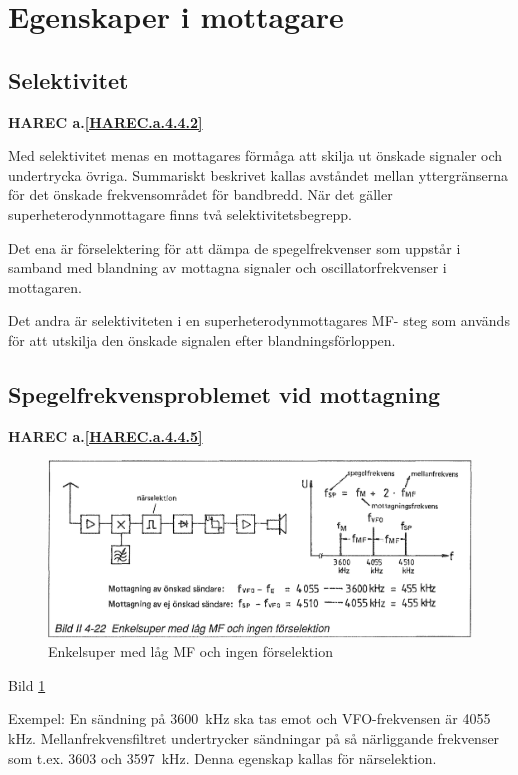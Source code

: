 \section{Egenskaper i mottagare}

\subsection{Selektivitet}
\textbf{HAREC a.\ref{HAREC.a.4.4.2}\label{myHAREC.a.4.4.2}}

Med selektivitet menas en mottagares förmåga att skilja ut önskade
signaler och undertrycka övriga. Summariskt beskrivet kallas avståndet
mellan yttergränserna för det önskade frekvensområdet för
bandbredd. När det gäller superheterodynmottagare finns två
selektivitetsbegrepp.

Det ena är förselektering för att dämpa de spegelfrekvenser som
uppstår i samband med blandning av mottagna signaler och
oscillatorfrekvenser i mottagaren.

Det andra är selektiviteten i en superheterodynmottagares MF- steg som används
för att utskilja den önskade signalen efter blandningsförloppen.

\subsection{Spegelfrekvensproblemet vid mottagning}
\textbf{HAREC a.\ref{HAREC.a.4.4.5}\label{myHAREC.a.4.4.5}}

\begin{figure}
  \includegraphics[width=\textwidth]{images/bild_2_4-22}
  \caption{Enkelsuper med låg MF och ingen förselektion}
  \label{fig:bildII4-22}
\end{figure}

Bild \ref{fig:bildII4-22}

Exempel: En sändning på 3600~kHz ska tas emot och VFO-frekvensen är
4055 kHz. Mellanfrekvensfiltret undertrycker sändningar på så
närliggande frekvenser som t.ex. 3603 och 3597~kHz. Denna egenskap
kallas för närselektion.


